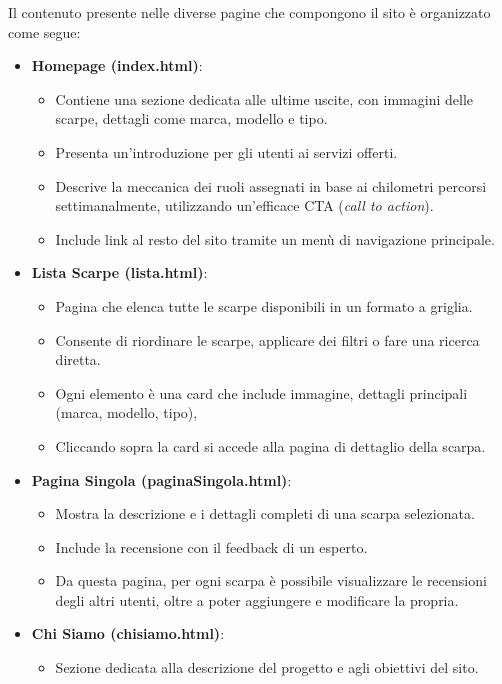 \documentclass[a4paper, 12pt]{article}
\begin{document}
\begin{justify}
Il contenuto presente nelle diverse pagine che compongono il sito è organizzato come segue:
\begin{itemize}
    \item \textbf{Homepage (index.html)}:
        \begin{itemize}
            \item Contiene una sezione dedicata alle ultime uscite, con immagini delle scarpe, dettagli come marca, modello e tipo.
            \item Presenta un'introduzione per gli utenti ai servizi offerti.
            \item Descrive la meccanica dei ruoli assegnati in base ai chilometri percorsi settimanalmente, utilizzando un'efficace CTA (\textit{call to action}).
            \item Include link al resto del sito tramite un menù di navigazione principale.
        \end{itemize}
    \item \textbf{Lista Scarpe (lista.html)}:
        \begin{itemize}
            \item Pagina che elenca tutte le scarpe disponibili in un formato a griglia.
            \item Consente di riordinare le scarpe, applicare dei filtri o fare una ricerca diretta.
            \item Ogni elemento è una card che include immagine, dettagli principali (marca, modello, tipo), 
            \item Cliccando sopra la card si accede alla pagina di dettaglio della scarpa.
        \end{itemize}
    \item \textbf{Pagina Singola (paginaSingola.html)}:
        \begin{itemize}
            \item Mostra la descrizione e i dettagli completi di una scarpa selezionata.
            \item Include la recensione con il feedback di un esperto.
            \item Da questa pagina, per ogni scarpa è possibile visualizzare le recensioni degli altri utenti, oltre a poter aggiungere e modificare la propria.
        \end{itemize}
    \item \textbf{Chi Siamo (chisiamo.html)}:
        \begin{itemize}
            \item Sezione dedicata alla descrizione del progetto e agli obiettivi del sito.

\end{itemize}
\end{itemize}
\end{justify}
\end{document}
